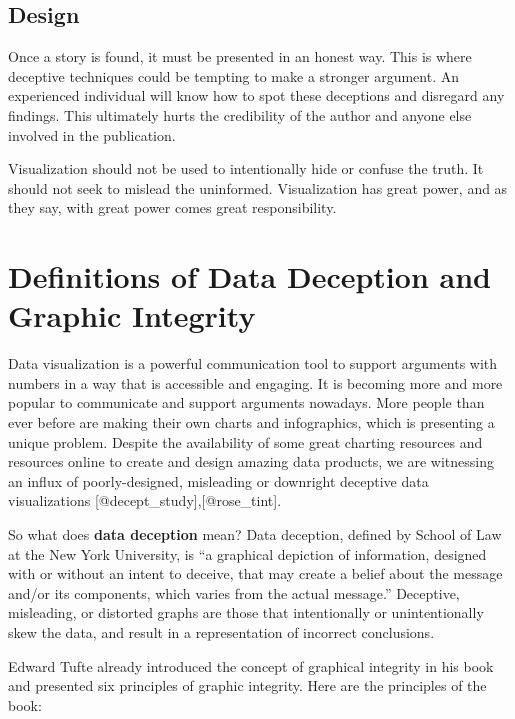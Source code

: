 \documentclass[]{book}
\theoremstyle{definition}
\theoremstyle{definition}
\theoremstyle{definition}
\theoremstyle{remark}
\begin{document}
\subsection{Design}\label{design}

Once a story is found, it must be presented in an honest way. This is
where deceptive techniques could be tempting to make a stronger
argument. An experienced individual will know how to spot these
deceptions and disregard any findings. This ultimately hurts the
credibility of the author and anyone else involved in the publication.

Visualization should not be used to intentionally hide or confuse the
truth. It should not seek to mislead the uninformed. Visualization has
great power, and as they say, with great power comes great
responsibility.

\section{Definitions of Data Deception and Graphic
Integrity}\label{definitions-of-data-deception-and-graphic-integrity}

Data visualization is a powerful communication tool to support arguments
with numbers in a way that is accessible and engaging. It is becoming
more and more popular to communicate and support arguments nowadays.
More people than ever before are making their own charts and
infographics, which is presenting a unique problem. Despite the
availability of some great charting resources and resources online to
create and design amazing data products, we are witnessing an influx of
poorly-designed, misleading or downright deceptive data visualizations
{[}@decept\_study{]},{[}@rose\_tint{]}.

So what does \textbf{data deception} mean? Data deception, defined by
School of Law at the New York University, is ``a graphical depiction of
information, designed with or without an intent to deceive, that may
create a belief about the message and/or its components, which varies
from the actual message.'' Deceptive, misleading, or distorted graphs
are those that intentionally or unintentionally skew the data, and
result in a representation of incorrect conclusions.

Edward Tufte already introduced the concept of graphical integrity in
his book and presented six principles of graphic integrity. Here are the
principles of the book:
\end{document}
